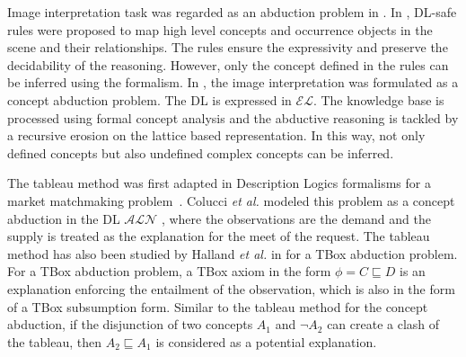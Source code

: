 \documentclass{article}
\begin{document}
Image interpretation task was regarded as an abduction problem in \cite{atif2014explanatory,gries2010probabilistic,neumann2008scene,shanahan2005perception}.
In \cite{neumann2008scene}, DL-safe rules were proposed to map high level concepts and occurrence objects in the scene and their relationships.
The rules ensure the expressivity and preserve the decidability of the reasoning. However, only the concept defined in the rules can be inferred using 
the formalism. In \cite{atif2014explanatory}, the image interpretation was formulated as a concept abduction problem.
The DL is expressed in $\mathcal{EL}$. The knowledge base is processed using formal concept analysis and the abductive reasoning is tackled
by a recursive erosion on the lattice based representation. In this way, not only defined concepts but also undefined complex concepts can be inferred.


The tableau method was first adapted in Description Logics formalisms for a market matchmaking problem~\cite{colucci2004uniform}.
Colucci \textit{et al.} modeled this problem as a concept abduction in the DL $\mathcal{ALN}$ \cite{colucci2004uniform},
where the observations are the demand and the supply is treated as the explanation for the meet of the request.
The tableau method has also been studied by Halland \textit{et al.} in \cite{halland2014tbox} for a TBox abduction problem.
For a TBox abduction problem, a TBox axiom in the form $\phi= C\sqsubseteq D$ is an explanation enforcing the entailment of the observation,
which is also in the form of  a TBox subsumption form. Similar to the tableau method for the  concept abduction, if the disjunction of
two concepts $A_1$  and $\neg A_2$ can create a clash of the tableau, then $A_2 \sqsubseteq A_1$ is considered as a potential explanation.
\end{document}
